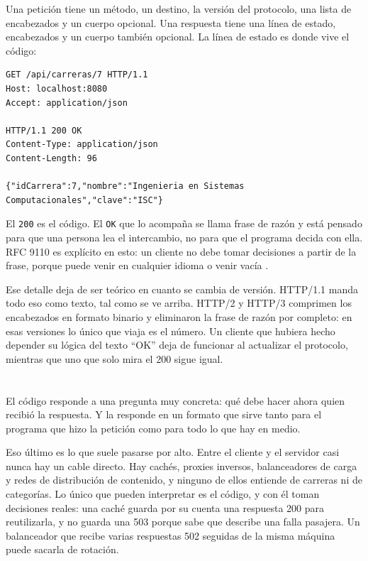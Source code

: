\documentclass[10pt,a4paper]{article}
\begin{document}
Una petición tiene un método, un destino, la versión del protocolo, una lista de encabezados y un cuerpo opcional. Una respuesta tiene una línea de estado, encabezados y un cuerpo también opcional. La línea de estado es donde vive el código:

\begin{lstlisting}[caption={Un intercambio completo, con la linea de estado en la primera linea de la respuesta}]
GET /api/carreras/7 HTTP/1.1
Host: localhost:8080
Accept: application/json

HTTP/1.1 200 OK
Content-Type: application/json
Content-Length: 96

{"idCarrera":7,"nombre":"Ingenieria en Sistemas Computacionales","clave":"ISC"}
\end{lstlisting}

El \texttt{200} es el código. El \texttt{OK} que lo acompaña se llama frase de razón y está pensado para que una persona lea el intercambio, no para que el programa decida con ella. RFC 9110 es explícito en esto: un cliente no debe tomar decisiones a partir de la frase, porque puede venir en cualquier idioma o venir vacía \cite{rfc9110}.

Ese detalle deja de ser teórico en cuanto se cambia de versión. HTTP/1.1 manda todo eso como texto, tal como se ve arriba. HTTP/2 y HTTP/3 comprimen los encabezados en formato binario y eliminaron la frase de razón por completo: en esas versiones lo único que viaja es el número. Un cliente que hubiera hecho depender su lógica del texto \enquote{OK} deja de funcionar al actualizar el protocolo, mientras que uno que solo mira el 200 sigue igual.

\section{\color{colorIPN}{Para qué sirve el código de respuesta}}

El código responde a una pregunta muy concreta: qué debe hacer ahora quien recibió la respuesta. Y la responde en un formato que sirve tanto para el programa que hizo la petición como para todo lo que hay en medio.

Eso último es lo que suele pasarse por alto. Entre el cliente y el servidor casi nunca hay un cable directo. Hay cachés, proxies inversos, balanceadores de carga y redes de distribución de contenido, y ninguno de ellos entiende de carreras ni de categorías. Lo único que pueden interpretar es el código, y con él toman decisiones reales: una caché guarda por su cuenta una respuesta 200 para reutilizarla, y no guarda una 503 porque sabe que describe una falla pasajera. Un balanceador que recibe varias respuestas 502 seguidas de la misma máquina puede sacarla de rotación.
\end{document}
